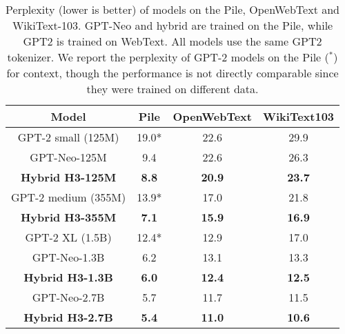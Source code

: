 \begin{table}[t]
    \small
    \centering
    \caption{\label{table:gpt} Perplexity (lower is better) of models on the Pile, OpenWebText and
      WikiText-103. GPT-Neo and hybrid \hthree are trained on the Pile, while GPT2 is
      trained on WebText. All models use the same GPT2 tokenizer. We report the
      perplexity of GPT-2 models on the Pile ($^*$) for context, though the performance is not directly comparable since they were trained on different data.}
    {
      \begin{tabular}{@{}|c|c|cc|@{}}
      \hline
        Model & Pile & OpenWebText & WikiText103 \\ %
        \hline
        GPT-2 small (125M) & 19.0* & 22.6 & 29.9 \\
        GPT-Neo-125M & 9.4 & 22.6 & 26.3 \\
        \textbf{Hybrid H3-125M} & \textbf{8.8} & \textbf{20.9} & \textbf{23.7} \\ \hline %
        GPT-2 medium (355M) & 13.9* & 17.0 & 21.8 \\ %
        \textbf{Hybrid H3-355M} & \textbf{7.1} & \textbf{15.9} & \textbf{16.9} \\ \hline
        GPT-2 XL (1.5B) & 12.4* & 12.9 & 17.0 \\
        GPT-Neo-1.3B & 6.2 & 13.1 & 13.3 \\
        \textbf{Hybrid H3-1.3B} & \textbf{6.0} & \textbf{12.4} & \textbf{12.5} \\
        \hline
        GPT-Neo-2.7B & 5.7 & 11.7 & 11.5 \\
        \textbf{Hybrid H3-2.7B} & \textbf{5.4} & \textbf{11.0} & \textbf{10.6} \\
        \hline
      \end{tabular}
    }
  \end{table}
